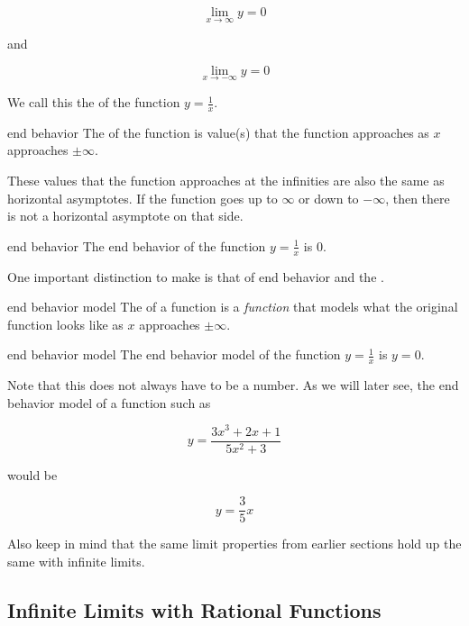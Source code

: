 \[ \lim_{x \to \infty} y = 0 \]

and

\[ \lim_{x \to -\infty} y = 0 \]

We call this the  of the function \( y = \frac{1}{x} \).

\begin{definition}{end behavior}
    The  of the function is value(s) that the function approaches as \( x \) approaches \( \pm \infty \).
    
    \vspace{0.5cm}
    
    These values that the function approaches at the infinities are also the same as horizontal asymptotes. If the function goes up to \( \infty \) or down to \( -\infty \), then there is not a horizontal asymptote on that side.
\end{definition}

\begin{example}{end behavior}
    The end behavior of the function \( y = \frac{1}{x} \) is \( 0 \).
\end{example}

One important distinction to make is that of end behavior and the .

\begin{definition}{end behavior model}
    The  of a function is a \textit{function} that models what the original function looks like as \( x \) approaches \( \pm\infty \).
\end{definition}

\begin{example}{end behavior model}
    The end behavior model of the function \( y = \frac{1}{x} \) is \( y = 0 \).
    
    Note that this does not always have to be a number. As we will later see, the end behavior model of a function such as
    
    \[ y = \dfrac{3x^3 + 2x + 1}{5x^2 + 3} \]
    
    would be
    
    \[ y = \dfrac{3}{5}x \]
\end{example}

Also keep in mind that the same limit properties from earlier sections hold up the same with infinite limits.

\subsection{Infinite Limits with Rational Functions}


